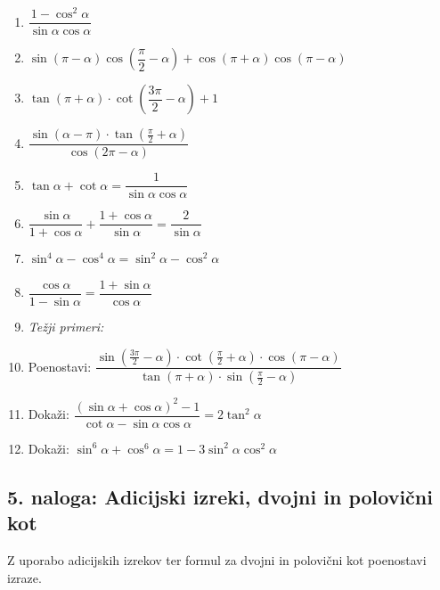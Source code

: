\documentclass[11pt,a4paper]{article}
\newcommand{\naloga}[1]{\subsection*{#1}}
\begin{document}
\begin{enumerate}[label=\alph*), itemsep=8pt]
  \item $\dfrac{1-\cos^2\alpha}{\sin\alpha\cos\alpha}$
  \item $\sin(\pi-\alpha)\cos\left(\dfrac{\pi}{2}-\alpha\right) + \cos(\pi+\alpha)\cos(\pi-\alpha)$
  \item $\tan(\pi+\alpha)\cdot\cot\left(\dfrac{3\pi}{2}-\alpha\right) + 1$
  \item $\dfrac{\sin(\alpha-\pi)\cdot\tan\left(\frac{\pi}{2}+\alpha\right)}{\cos(2\pi-\alpha)}$
  \item $\tan\alpha + \cot\alpha = \dfrac{1}{\sin\alpha\cos\alpha}$
  \item $\dfrac{\sin\alpha}{1+\cos\alpha} + \dfrac{1+\cos\alpha}{\sin\alpha} = \dfrac{2}{\sin\alpha}$
  \item $\sin^4\alpha - \cos^4\alpha = \sin^2\alpha - \cos^2\alpha$
  \item $\dfrac{\cos\alpha}{1-\sin\alpha} = \dfrac{1+\sin\alpha}{\cos\alpha}$
  \item[] \textit{Težji primeri:}
  \item Poenostavi: $\dfrac{\sin\left(\frac{3\pi}{2}-\alpha\right)\cdot\cot\left(\frac{\pi}{2}+\alpha\right)\cdot\cos(\pi-\alpha)}{\tan(\pi+\alpha)\cdot\sin\left(\frac{\pi}{2}-\alpha\right)}$
  \item Dokaži: $\dfrac{(\sin\alpha+\cos\alpha)^2 - 1}{\cot\alpha - \sin\alpha\cos\alpha} = 2\tan^2\alpha$
  \item Dokaži: $\sin^6\alpha + \cos^6\alpha = 1 - 3\sin^2\alpha\cos^2\alpha$
\end{enumerate}

\naloga{5. naloga: Adicijski izreki, dvojni in polovični kot}

Z uporabo adicijskih izrekov ter formul za dvojni in polovični kot poenostavi izraze.
\end{document}
